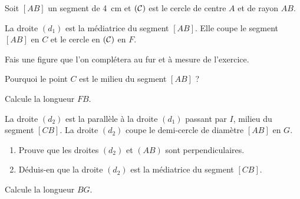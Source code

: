 Soit $[AB]$ un segment de 4~cm et $(\cal C)$ est le cercle de
 centre $A$ et de rayon $AB$.\par La droite $(d_1)$ est la médiatrice
 du segment $[AB]$.  Elle coupe le segment $[AB]$ en $C$ et le cercle
 en $(\cal C)$ en $F$.
\begin{myenumerate}
\item Fais une figure que l'on complétera au fur et à mesure de
l'exercice.
\item Pourquoi le point $C$ est le milieu du segment $[AB]$ ?
\item Calcule la longueur $FB$.
\item La droite $(d_2)$ est la parallèle à la droite $(d_1)$ passant
par $I$, milieu du segment $[CB]$. La droite $(d_2)$ coupe le
demi-cercle de diamètre $[AB]$ en $G$.
\begin{enumerate}
\item Prouve que les droites $(d_2)$ et $(AB)$ sont perpendiculaires.
\item Déduis-en que la droite $(d_2)$ est la médiatrice du segment
$[CB]$.
\end{enumerate}
\item Calcule la longueur $BG$.
\end{myenumerate}